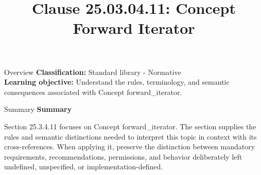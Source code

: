 \documentclass[10pt,letterpaper]{article}
\title{Clause 25.03.04.11: Concept Forward Iterator}
\author{}
\date{}
\begin{document}
\maketitle
\begin{CornellOverviewBox}{Overview}
\textbf{Classification:} Standard library - Normative\\[2pt]
\textbf{Learning objective:} Understand the rules, terminology, and semantic consequences associated with Concept forward\_iterator.
\end{CornellOverviewBox}\begin{CornellSummaryBox}{Summary}
{\sffamily\bfseries\color{Accent} Summary}\par\vspace{3pt}Section 25.3.4.11 focuses on Concept forward\_iterator. The section supplies the rules and semantic distinctions needed to interpret this topic in context with its cross-references. When applying it, preserve the distinction between mandatory requirements, recommendations, permissions, and behavior deliberately left undefined, unspecified, or implementation-defined.
\end{CornellSummaryBox}
\end{document}

